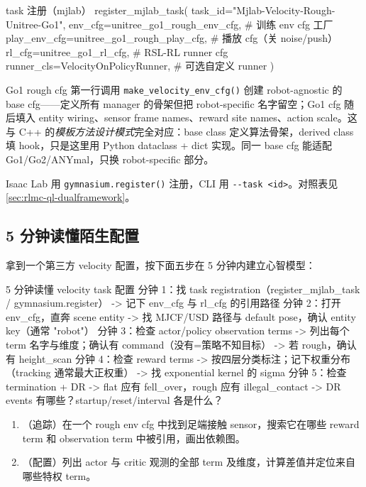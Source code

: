 \begin{codebox}[Python]{task 注册（mjlab）}
register_mjlab_task(
    task_id="Mjlab-Velocity-Rough-Unitree-Go1",
    env_cfg=unitree_go1_rough_env_cfg,        # 训练 env cfg 工厂
    play_env_cfg=unitree_go1_rough_play_cfg,  # 播放 cfg（关 noise/push）
    rl_cfg=unitree_go1_rl_cfg,                # RSL-RL runner cfg
    runner_cls=VelocityOnPolicyRunner,         # 可选自定义 runner
)
\end{codebox}

\begin{note}
Go1 rough cfg 第一行调用 \verb|make_velocity_env_cfg()| 创建 robot-agnostic 的 base cfg——定义所有 manager 的骨架但把 robot-specific 名字留空；Go1 cfg 随后填入 entity wiring、sensor frame names、reward site names、action scale。这与 C++ 的\emph{模板方法设计模式}完全对应：base class 定义算法骨架，derived class 填 hook，只是这里用 Python dataclass + dict 实现。同一 base cfg 能适配 Go1/Go2/ANYmal，只换 robot-specific 部分。
\end{note}

Isaac Lab 用 \verb|gymnasium.register()| 注册，CLI 用 \verb|--task <id>|。对照表见 \cref{sec:rlmc-ql-dualframework}。

\subsection{5 分钟读懂陌生配置}
\label{sec:rlmc-ql-readpath-5min}

拿到一个第三方 velocity 配置，按下面五步在 5 分钟内建立心智模型：

\begin{codebox}{5 分钟读懂 velocity task 配置}
分钟 1：找 task registration（register_mjlab_task / gymnasium.register）
        -> 记下 env_cfg 与 rl_cfg 的引用路径
分钟 2：打开 env_cfg，直奔 scene entity
        -> 找 MJCF/USD 路径与 default pose，确认 entity key（通常 "robot"）
分钟 3：检查 actor/policy observation terms
        -> 列出每个 term 名字与维度；确认有 command（没有=策略不知目标）
        -> 若 rough，确认有 height_scan
分钟 4：检查 reward terms
        -> 按四层分类标注；记下权重分布（tracking 通常最大正权重）
        -> 找 exponential kernel 的 sigma
分钟 5：检查 termination + DR
        -> flat 应有 fell_over，rough 应有 illegal_contact
        -> DR events 有哪些？startup/reset/interval 各是什么？
\end{codebox}

\begin{practice}[链路阅读]
\begin{enumerate}
\item （追踪）在一个 rough env cfg 中找到足端接触 sensor，搜索它在哪些 reward term 和 observation term 中被引用，画出依赖图。
\item （配置）列出 actor 与 critic 观测的全部 term 及维度，计算差值并定位来自哪些特权 term。
\end{enumerate}
\end{practice}

